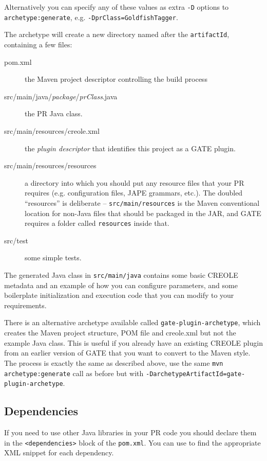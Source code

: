 Alternatively you can specify any of these values as extra \verb!-D! options to
\verb!archetype:generate!, e.g. \verb!-DprClass=GoldfishTagger!.

The archetype will create a new directory named after the \texttt{artifactId},
containing a few files:
\begin{description}
\item[pom.xml] the Maven project descriptor controlling the build process
\item[src/main/java/\emph{package}/\emph{prClass}.java] the PR Java class.
\item[src/main/resources/creole.xml] the \emph{plugin descriptor} that
  identifies this project as a GATE plugin.
\item[src/main/resources/resources] a directory into which you should put any
  resource files that your PR requires (e.g. configuration files, JAPE
  grammars, etc.).  The doubled ``resources'' is deliberate --
  \verb!src/main/resources! is the Maven conventional location for non-Java
  files that should be packaged in the JAR, and GATE requires a folder called
  \verb!resources! inside that.
\item[src/test] some simple tests.
\end{description}

The generated Java class in \texttt{src/main/java} contains some basic CREOLE
metadata and an example of how you can configure parameters, and some
boilerplate initialization and execution code that you can modify to your
requirements.

There is an alternative archetype available called
\texttt{gate-plugin-archetype}, which creates the Maven project structure, POM
file and creole.xml but not the example Java class.  This is useful if you
already have an existing CREOLE plugin from an earlier version of GATE that you
want to convert to the Maven style.  The process is exactly the same as
described above, use the same \texttt{mvn archetype:generate} call as before
but with \verb!-DarchetypeArtifactId=gate-plugin-archetype!.

\subsection*{Dependencies}

If you need to use other Java libraries in your PR code you should declare them
in the \verb!<dependencies>! block of the \texttt{pom.xml}.  You can use
 to find the appropriate XML snippet for
each dependency.

